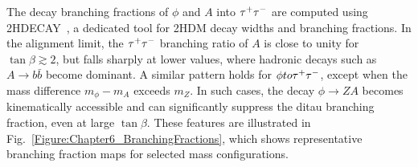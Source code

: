 The decay branching fractions of $\phi$ and $A$ into $\tau^+\tau^-$ are computed using \textsc{2HDECAY}~\cite{2HDECAY}, a dedicated tool for 2HDM decay widths and branching fractions. In the alignment limit, the $\tau^+\tau^-$ branching ratio of $A$ is close to unity for $\tan\beta \gtrsim 2$, but falls sharply at lower values, where hadronic decays such as $A \to b\bar{b}$ become dominant. A similar pattern holds for $\phi to \tau^+\tau^-$, except when the mass difference $m_\phi - m_A$ exceeds $m_Z$. In such cases, the decay $\phi \to ZA$ becomes kinematically accessible and can significantly suppress the ditau branching fraction, even at large $\tan\beta$. These features are illustrated in Fig.~\ref{Figure:Chapter6_BranchingFractions}, which shows representative branching fraction maps for selected mass configurations. 

